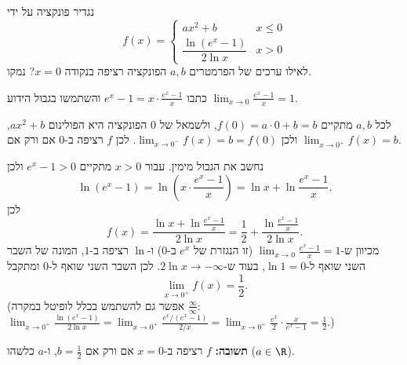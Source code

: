 
\begin{question}
נגדיר פונקציה על ידי
\[ f(x) = \begin{cases} ax^2 + b & x \le 0 \\ \dfrac{\ln(e^x - 1)}{2\ln x} & x > 0 \end{cases} \]
לאילו ערכים של הפרמטרים $a, b$ הפונקציה רציפה בנקודה $x=0$? נמקו.
\end{question}

\begin{hint}
כתבו $e^x - 1 = x \cdot \frac{e^x - 1}{x}$ והשתמשו בגבול הידוע $\lim_{x\to 0}\frac{e^x-1}{x} = 1$.
\end{hint}

\begin{solution}
לכל $a,b$ מתקיים $f(0) = a\cdot 0 + b = b$, ולשמאל של $0$ הפונקציה היא הפולינום $ax^2+b$, ולכן
$\lim_{x\to 0^-} f(x) = b = f(0)$. לכן $f$ רציפה ב-$0$ אם ורק אם $\lim_{x\to 0^+} f(x) = b$.

נחשב את הגבול מימין. עבור $x>0$ מתקיים $e^x - 1 > 0$ ולכן
\[ \ln(e^x - 1) = \ln\left( x \cdot \frac{e^x-1}{x} \right) = \ln x + \ln\frac{e^x - 1}{x}. \]
לכן
\[ f(x) = \frac{\ln x + \ln\frac{e^x-1}{x}}{2\ln x} = \frac12 + \frac{\ln\frac{e^x-1}{x}}{2\ln x}. \]
מכיוון ש-$\lim_{x\to 0}\frac{e^x - 1}{x} = 1$ (זו הנגזרת של $e^x$ ב-$0$) ו-$\ln$ רציפה ב-$1$, המונה של השבר השני שואף ל-$\ln 1 = 0$,
בעוד ש-$2\ln x \to -\infty$. לכן השבר השני שואף ל-$0$ ומתקבל
\[ \lim_{x\to 0^+} f(x) = \frac12. \]
(אפשר גם להשתמש בכלל לופיטל במקרה $\frac{\infty}{\infty}$:
$\lim_{x\to0^+}\frac{\ln(e^x-1)}{2\ln x} = \lim_{x\to0^+}\frac{e^x/(e^x-1)}{2/x} = \lim_{x\to 0^+}\frac{e^x}{2}\cdot\frac{x}{e^x-1} = \frac12$.)

\textbf{תשובה:} $f$ רציפה ב-$x=0$ אם ורק אם $b = \frac12$, ו-$a$ כלשהו ($a \in \R$).
\end{solution}
